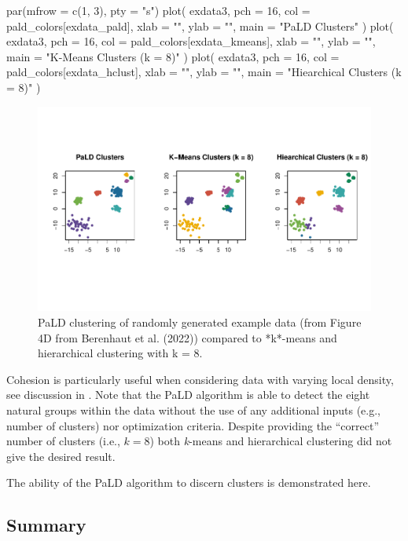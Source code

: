 \begin{Schunk}
\begin{Sinput}
par(mfrow = c(1, 3), pty = "s")
plot(
  exdata3,
  pch = 16,
  col = pald_colors[exdata_pald],
  xlab = "",
  ylab = "",
  main = "PaLD Clusters"
)
plot(
  exdata3,
  pch = 16,
  col = pald_colors[exdata_kmeans],
  xlab = "",
  ylab = "",
  main = "K-Means Clusters (k = 8)"
)
plot(
  exdata3,
  pch = 16,
  col = pald_colors[exdata_hclust],
  xlab = "",
  ylab = "",
  main = "Hiearchical Clusters (k = 8)"
)
\end{Sinput}
\begin{figure}
\includegraphics{manuscript_files/figure-latex/fig5-1} \caption[PaLD clustering of randomly generated example data (from Figure 4D from Berenhaut et al]{PaLD clustering of randomly generated example data (from Figure 4D from Berenhaut et al. (2022)) compared to *k*-means and hierarchical clustering with k = 8.}\label{fig:fig5}
\end{figure}
\end{Schunk}

Cohesion is particularly useful when considering data with varying local
density, see discussion in \citep{berenhaut2022social}. Note that the
PaLD algorithm is able to detect the eight natural groups within the
data without the use of any additional inputs (e.g., number of clusters)
nor optimization criteria. Despite providing the ``correct'' number of
clusters (i.e., \(k = 8\)) both \emph{k}-means and hierarchical
clustering did not give the desired result.

The ability of the PaLD algorithm to discern clusters is demonstrated
here.

\hypertarget{summary}{%
\subsection{Summary}\label{summary}}

